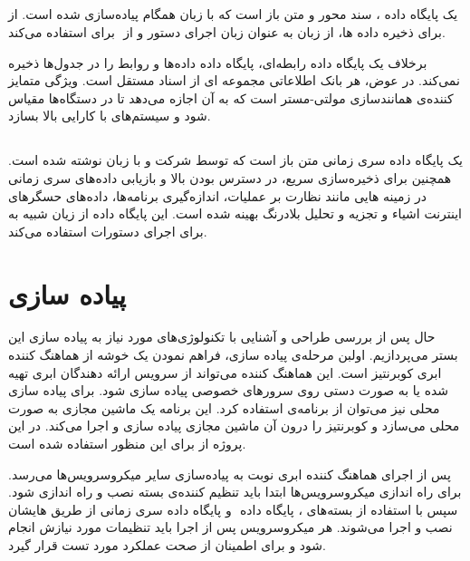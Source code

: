 \subsection{}

 یک پایگاه داده ، سند محور و متن باز است که با زبان همگام  پیاده‌سازی شده است. از  برای ذخیره داده ها، از زبان  به عنوان زبان اجرای دستور و از ‌ برای  استفاده می‌کند.

برخلاف یک پایگاه داده رابطه‌ای، پایگاه داده  داده‌ها و روابط را در جدول‌ها ذخیره نمی‌کند. در عوض، هر بانک اطلاعاتی مجموعه ای از اسناد مستقل است. ویژگی متمایز کننده‌ی  همانند‌سازی ‌مولتی-مستر است که به آن اجازه می‌دهد تا در دستگاه‌ها مقیاس شود و سیستم‌های با کارایی بالا بسازد.
\cite{couchdb}

\subsection{}

 یک پایگاه داده سری زمانی متن باز است که توسط شرکت  و با زبان  نوشته شده است. همچنین برای ذخیره‌سازی سریع، در دسترس بودن بالا و بازیابی داده‌های سری زمانی در زمینه هایی مانند نظارت بر عملیات، اندازه‌گیری برنامه‌ها، داده‌های حسگرهای اینترنت اشیاء و تجزیه و تحلیل بلادرنگ بهینه شده است. این پایگاه داده از زیان شبیه به  برای اجرای دستورات استفاده می‌کند.
\cite{influxdb}

\newpage

\section{پیاده سازی}

حال پس از بررسی طراحی و آشنایی با تکنولوژی‌های مورد نیاز به پیاده سازی این بستر می‌پردازیم. اولبن مرحله‌ی پیاده سازی، فراهم نمودن یک خوشه از هماهنگ کننده ابری کوبرنتیز است. این هماهنگ کننده می‌تواند از سرویس‌ ارائه دهندگان ابری تهیه شده یا به صورت دستی روی سرور‌های خصوصی ‌پیاده سازی شود. برای پیاده سازی محلی نیز می‌توان از برنامه‌ی  استفاده کرد. این برنامه یک ماشین مجازی به صورت محلی می‌سازد و کوبرنتیز را درون آن ماشین مجازی پیاده سازی و اجرا می‌کند. در این پروژه از  برای این منظور استفاده شده است.

پس از اجرای هماهنگ کننده ابری نوبت به پیاده‌سازی سایر میکروسرویس‌ها می‌رسد. برای راه اندازی میکروسرویس‌ها ابتدا باید تنظیم کننده‌ی بسته  نصب و راه اندازی شود. سپس با استفاده از  بسته‌های ، پایگاه داده ‌ و پایگاه داده سری زمانی  از طریق  هایشان نصب و اجرا می‌شوند. هر میکروسرویس پس از اجرا باید تنظیمات مورد نیازش انجام شود و برای اطمینان از صحت عملکرد مورد تست قرار گیرد.

